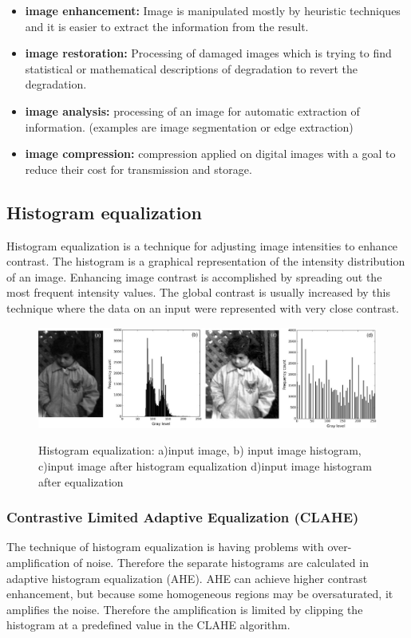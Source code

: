 \begin{itemize}
	\item \textbf{image enhancement:} Image is manipulated mostly by heuristic techniques and it is easier to extract the information from the result.
	\item \textbf{image restoration:} Processing of damaged images which is trying to find statistical or mathematical descriptions of degradation to revert the degradation.
	\item \textbf{image analysis:} processing of an image for automatic extraction of information. (examples are image segmentation or edge extraction)
	\item \textbf{image compression:} compression applied on digital images with a goal to reduce their cost for transmission and storage.
\end{itemize}\cite{imageProcessing}

\subsection{Histogram equalization}
Histogram equalization is a technique for adjusting image intensities to enhance contrast. The histogram is a graphical representation of the intensity distribution of an image. Enhancing image contrast is accomplished by spreading out the most frequent intensity values. The global contrast is usually increased by this technique where the data on an input were represented with very close contrast. \cite{histogram}

\begin{figure}[H]
    \centering
        {\includegraphics[width=0.8\linewidth]{obrazky-figures/histogram.png}}\\
        \caption{Histogram equalization: a)input image, b) input image histogram, c)input image after histogram equalization d)input image histogram after equalization\cite{histogram}}
        \label{fig:histogram_eq}
\end{figure}

\subsubsection{Contrastive Limited Adaptive Equalization (CLAHE)}
The technique of histogram equalization is having problems with over-amplification of noise. Therefore the separate histograms are calculated in adaptive histogram equalization (AHE). AHE can achieve higher contrast enhancement, but because some homogeneous regions may be oversaturated, it amplifies the noise. Therefore the amplification is limited by clipping the histogram at a predefined value in the CLAHE algorithm. \cite{histogram}


